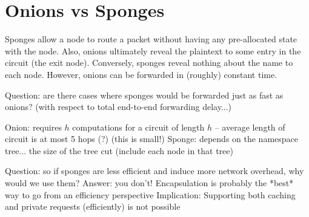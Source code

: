 \documentclass{article}
\begin{document}
\section{Onions vs Sponges}
Sponges allow a node to route a packet without having any pre-allocated state with
the node. Also, onions ultimately reveal the plaintext to some entry in the circuit (the
exit node). Conversely, sponges reveal nothing about the name to each node. However,
onions can be forwarded in (roughly) constant time.

Question: are there cases where sponges would be forwarded just as fast as onions?
(with respect to total end-to-end forwarding delay...)

Onion: requires $h$ computations for a circuit of length $h$ -- average length of circuit is at most 5 hops (?) (this is small!)
Sponge: depends on the namespace tree... the size of the tree cut (include each node in that tree)

Question: so if sponges are less efficient and induce more network overhead, why would we use them?
Answer: you don't! Encapsulation is probably the *best* way to go from an efficiency perspective
Implication: Supporting both caching and private requests (efficiently) is not possible
\end{document}
